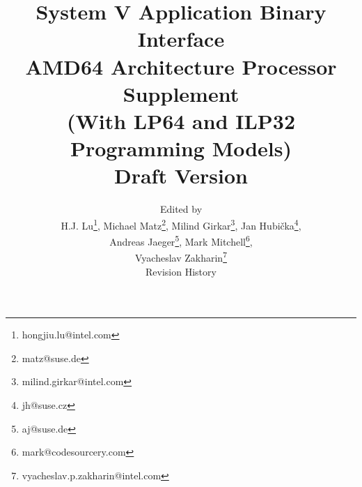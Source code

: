 \documentclass[12pt]{report}
\begin{document}
\author{Edited by\\
  H.J. Lu\thanks{hongjiu.lu@intel.com},
  Michael Matz\thanks{matz@suse.de},
  Milind Girkar\thanks{milind.girkar@intel.com},
  Jan Hubi\v{c}ka\thanks{jh@suse.cz},\\
  Andreas Jaeger\thanks{aj@suse.de},
  Mark Mitchell\thanks{mark@codesourcery.com}, \\
  Vyacheslav Zakharin\thanks{vyacheslav.p.zakharin@intel.com}

\title{System V Application Binary Interface\\
{\Large AMD64 Architecture Processor Supplement\\
(With LP64 and ILP32 Programming Models)\\
Draft Version \version}}
\maketitle
\tableofcontents
\listoftables
\listoffigures

\section*{Revision History}

\begin{description}



\end{description}}
\end{document}

